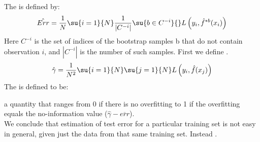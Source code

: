 The  is defined by: 
$$ \hat{Err}=\dfrac{1}{N}\su{{i=1}}{N}\dfrac{1}{|C^{-i}|}\su{{b\in C^{-i}}}{}L\left(y_{i},
\hat{f}^{*b}(x_{i})\right)$$
Here $C^{-i}$ is the set of indices of the bootstrap samples b that do not contain observation $i$,
and $|C^{-i}|$ is the number of such samples.
First we define .
$$\hat{\gamma}=\dfrac{1}{N^{2}}\su{{i=1}}{N}\su{{j=1}}{N}L\left(y_{i},\hat{f}(x_{j})\right)$$
The  is defined to be:
\begin{center}
\end{center}
a quantity that ranges from 0 if there is no overfitting to 1 if the overfitting equals the
no-information value ($\hat{\gamma}-\overline{err}$).\\

We conclude that estimation of test error for a particular training set is not easy in general,
given just the data from that same training set. Instead .
